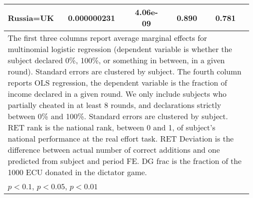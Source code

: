 \begin{tabular}{l|cccccc|cc}
Russia=UK       &0.000000231         &         & 4.06e-09         &         &    0.890         &         &    0.781         &         \\
\hline\hline
\multicolumn{9}{p{16cm}}{\tiny The first three columns report average marginal effects for multinomial logistic regression (dependent variable is whether the subject declared 0\%, 100\%, or something in between, in a given round). Standard errors are clustered by subject. The fourth column reports OLS regression, the dependent variable is the fraction of income declared in a given round. We only include subjects who partially cheated in at least 8 rounds, and declarations strictly between 0\% and 100\%. Standard errors are clustered by subject. RET rank is the national rank, between 0 and 1, of subject's national performance at the real effort task. RET Deviation is the difference between actual number of correct additions and one predicted from subject and period FE. DG frac is the fraction of the 1000 ECU donated in the dictator game.}\\
\multicolumn{9}{l}{\tiny \sym{*} \(p<0.1\), \sym{**} \(p<0.05\), \sym{***} \(p<0.01\)}\\
\end{tabular}